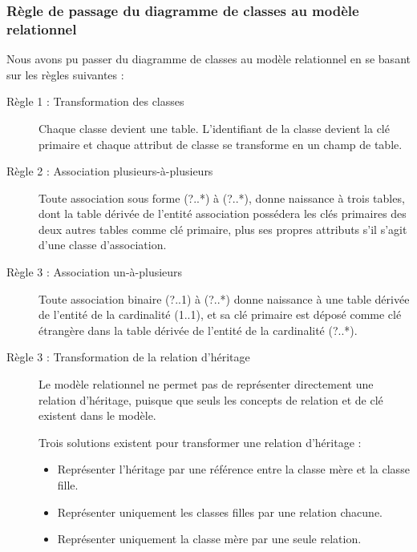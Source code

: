 \documentclass[french]{report}
\begin{document}
            \subsubsection{Règle de passage du diagramme de classes au modèle relationnel}
            Nous avons pu passer du diagramme de classes au modèle relationnel en se basant sur les règles suivantes :
            \begin{description}
                \item[Règle 1 : Transformation des classes] 
                Chaque classe devient une table. L'identifiant de la classe devient 
		la clé primaire et chaque attribut de classe se transforme en un champ de table.
                
                \item[Règle 2 : Association plusieurs-à-plusieurs] 
                 Toute association sous forme (?..*) à (?..*), donne naissance à trois tables,
		 dont la table dérivée de l'entité association possédera les clés primaires 
		 des deux autres tables comme clé primaire, plus ses propres attributs s'il s'agit d'une classe d'association.

                \item[Règle 3 : Association un-à-plusieurs] 
                Toute association binaire (?..1) à (?..*) donne naissance à une table 
		dérivée de l'entité de la cardinalité (1..1), et sa clé primaire est déposé
		comme clé étrangère dans la table dérivée de l'entité de la cardinalité (?..*).
                
                \item[Règle 3 : Transformation de la relation d'héritage] 
                
                Le modèle relationnel ne permet pas de représenter directement une relation d'héritage, puisque que seuls les 
                concepts de relation et de clé existent dans le modèle. \cite{scenari-community}
                
                Trois solutions existent pour transformer une relation d'héritage :
                \begin{itemize}
                    \item Représenter l'héritage par une référence entre la classe mère et la classe fille.\cite{scenari-community}
                    \item Représenter uniquement les classes filles par une relation chacune.\cite{scenari-community}
                    \item Représenter uniquement la classe mère par une seule relation.\cite{scenari-community}
                \end{itemize}
                

\end{description}
\end{document}

